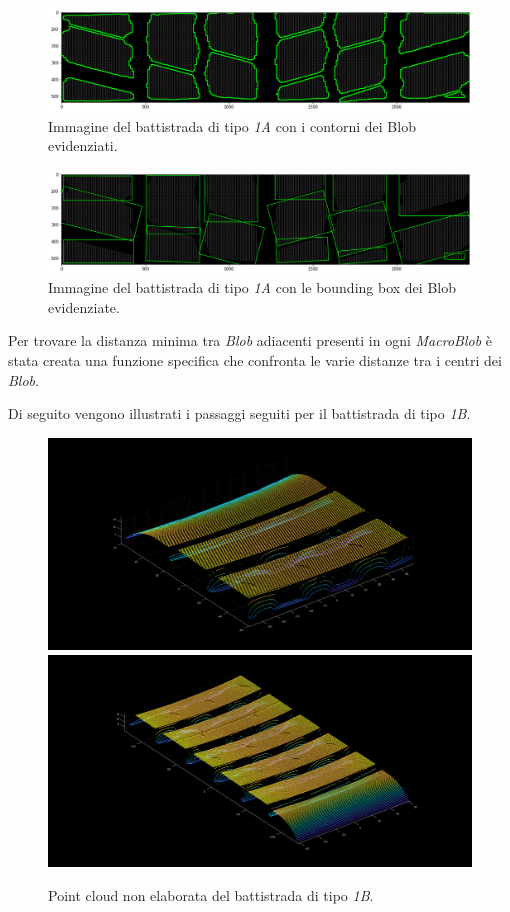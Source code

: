 \begin{figure}[H]
	\centering
	\includegraphics[width=0.9\columnwidth]{./pictures/batt_1a_analisi_11.png}
	\caption{Immagine del battistrada di tipo \textit{1A} con i contorni dei Blob evidenziati.}\label{fig:batt_1a_analisi_11}
\end{figure}

\begin{figure}[H]
	\centering
	\includegraphics[width=0.9\columnwidth]{./pictures/batt_1a_analisi_12.png}
	\caption{Immagine del battistrada di tipo \textit{1A} con le bounding box dei Blob evidenziate.}\label{fig:batt_1a_analisi_12}
\end{figure}

\noindent Per trovare la distanza minima tra \textit{Blob} adiacenti presenti in ogni \textit{MacroBlob} è stata creata una funzione specifica che confronta le varie distanze tra i centri dei \textit{Blob}.


\noindent Di seguito vengono illustrati i passaggi seguiti per il battistrada di tipo \textit{1B}.\\

\begin{figure}[H]
	\centering
	\includegraphics[width=0.45\columnwidth]{./pictures/batt_1b_analisi_1_1.png}
	\includegraphics[width=0.45\columnwidth]{./pictures/batt_1b_analisi_2_1.png}
	\caption{Point cloud non elaborata del battistrada di tipo \textit{1B}.}\label{fig:batt_1b_analisi_1}
\end{figure}

